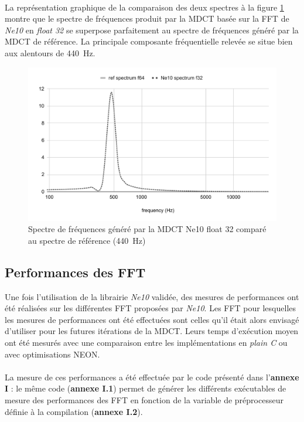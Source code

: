 \documentclass{article}
\begin{document}
    \paragraph{}
    La représentation graphique de la comparaison des deux spectres à la figure \ref{fig:validation_ne10_f32} montre que le spectre de fréquences produit par la MDCT basée sur la FFT de \emph{Ne10} en \emph{float 32} se superpose parfaitement au spectre de fréquences généré par la MDCT de référence. La principale composante fréquentielle relevée se situe bien aux alentours de \SI{440}{\hertz}.
    \begin{figure}[H]
        \centering
        \includegraphics[width=.8\linewidth]{./images/validation_ne10_f32.pdf}
        \caption{Spectre de fréquences généré par la MDCT Ne10 float 32 comparé au spectre de référence (\SI{440}{\hertz})}
        \label{fig:validation_ne10_f32}
    \end{figure}



    \subsection{Performances des FFT}
    \label{sec:fft_perfs}
    Une fois l'utilisation de la librairie \emph{Ne10} validée, des mesures de performances ont été réalisées sur les différentes FFT proposées par \emph{Ne10}. Les FFT pour lesquelles les mesures de performances ont été effectuées sont celles qu'il était alors envisagé d'utiliser pour les futures itérations de la MDCT. Leurs temps d'exécution moyen ont été mesurés avec une comparaison entre les implémentations en \emph{plain C} ou avec optimisations NEON.

    \paragraph{}
    La mesure de ces performances a été effectuée par le code présenté dans l'\textbf{annexe I} : le même code (\textbf{annexe I.1}) permet de générer les différents exécutables de mesure des performances des FFT en fonction de la variable de préprocesseur définie à la compilation (\textbf{annexe I.2}).
\end{document}
